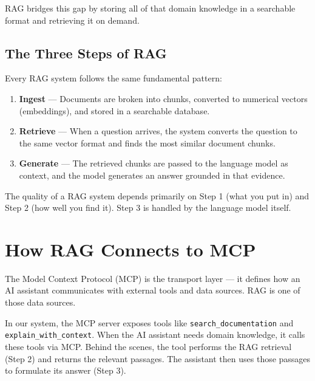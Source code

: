\documentclass[11pt,letterpaper]{article}
\begin{document}
RAG bridges this gap by storing all of that domain knowledge in a
searchable format and retrieving it on demand.

\subsection{The Three Steps of RAG}

Every RAG system follows the same fundamental pattern:

\begin{enumerate}
    \item \textbf{Ingest} — Documents are broken into chunks, converted
    to numerical vectors (embeddings), and stored in a searchable
    database.
    \item \textbf{Retrieve} — When a question arrives, the system
    converts the question to the same vector format and finds the most
    similar document chunks.
    \item \textbf{Generate} — The retrieved chunks are passed to the
    language model as context, and the model generates an answer
    grounded in that evidence.
\end{enumerate}

The quality of a RAG system depends primarily on Step 1 (what you put
in) and Step 2 (how well you find it). Step 3 is handled by the
language model itself.

\section{How RAG Connects to MCP}

The Model Context Protocol (MCP) is the transport layer — it defines
how an AI assistant communicates with external tools and data sources.
RAG is one of those data sources.

In our system, the MCP server exposes tools like
\texttt{search\_documentation} and \texttt{explain\_with\_context}.
When the AI assistant needs domain knowledge, it calls these tools via
MCP. Behind the scenes, the tool performs the RAG retrieval (Step 2)
and returns the relevant passages. The assistant then uses those
passages to formulate its answer (Step 3).

\begin{center}
\end{center}
\end{document}
